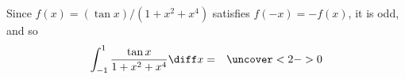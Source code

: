 \begin{frame}
\begin{example}[Example 9, p. 338]
Since $f(x) = (\tan x)/ (1 + x^2 + x^4) $ satisfies $f(-x) = -f(x)$, it is odd, and so
\begin{eqnarray*}
\int_{-1}^1 \frac{\tan x}{1+x^2+x^4} \diff x%
& = &%
\uncover<2->{%
0%
}%
\end{eqnarray*}
\end{example}
\end{frame}
